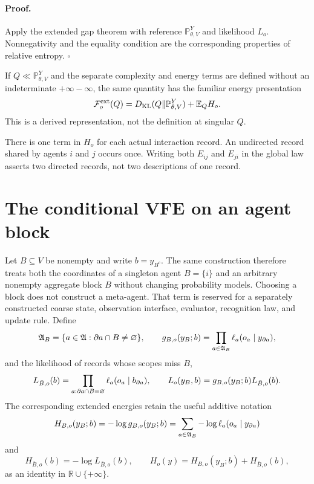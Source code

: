 \paragraph{Proof.}
Apply the extended gap theorem  with reference
\(\mathbb P_{\theta,V}^{Y}\) and likelihood \(L_o\). Nonnegativity and the equality condition are the
corresponding properties of relative entropy.  $\square$

If \(Q\ll\mathbb P_{\theta,V}^{Y}\) and the separate complexity and energy terms are defined without
an indeterminate $+\infty-\infty$, the same quantity has the familiar energy
presentation
\begin{equation}
\mathcal F_o^{\rm ext}(Q)
=D_{\mathrm{KL}}(Q\Vert\mathbb P_{\theta,V}^{Y})+\mathbb E_QH_o.
\label{eq:obs-collective-energy-form}
\end{equation}
This is a derived representation, not the definition at singular $Q$.

There is one term in $H_o$ for each actual interaction record.  An undirected
record shared by agents $i$ and $j$ occurs once.  Writing both $E_{ij}$ and
$E_{ji}$ in the global law asserts two directed records, not two descriptions
of one record.  

\section{The conditional VFE on an agent block}
\label{sec:local-conditional-vfe}

Let $B\subseteq V$ be nonempty and write $b=y_{B^c}$.  The same construction
therefore treats both the coordinates of a singleton agent $B=\{i\}$ and an
arbitrary nonempty aggregate block $B$ without changing probability models.
Choosing a block does not construct a meta-agent. That term is reserved for a
separately constructed coarse state, observation interface, evaluator,
recognition law, and update rule. Define
\begin{equation}
\mathfrak A_B=\{a\in\mathfrak A:\partial a\cap B\ne\varnothing\},
\qquad
g_{B,o}(y_B;b)=\prod_{a\in\mathfrak A_B}
\ell_a(o_a\mid y_{\partial a}),
\label{eq:obs-block-incident-likelihood}
\end{equation}
and the likelihood of records whose scopes miss $B$,
\begin{equation}
L_{\bar B,o}(b)=
\prod_{a:\partial a\cap B=\varnothing}
\ell_a(o_a\mid b_{\partial a}),
\qquad
L_o(y_B,b)=g_{B,o}(y_B;b)L_{\bar B,o}(b).
\label{eq:obs-block-outside-likelihood}
\end{equation}
The corresponding extended energies retain the useful additive notation
\begin{equation}
H_{B,o}(y_B;b)=-\log g_{B,o}(y_B;b)
=\sum_{a\in\mathfrak A_B}-\log\ell_a(o_a\mid y_{\partial a})
\label{eq:obs-block-incident-energy}
\end{equation}
and
\begin{equation}
H_{\bar B,o}(b)=-\log L_{\bar B,o}(b),
\qquad H_o(y)=H_{B,o}(y_B;b)+H_{\bar B,o}(b),
\label{eq:obs-block-outside-energy}
\end{equation}
as an identity in $\mathbb R\cup\{+\infty\}$.

